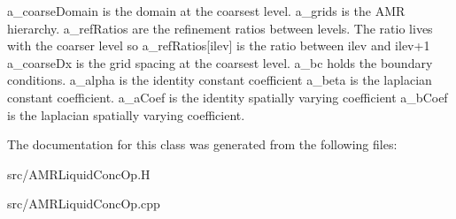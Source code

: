 a\-\_\-coarse\-Domain is the domain at the coarsest level. a\-\_\-grids is the A\-M\-R hierarchy. a\-\_\-ref\-Ratios are the refinement ratios between levels. The ratio lives with the coarser level so a\-\_\-ref\-Ratios\mbox{[}ilev\mbox{]} is the ratio between ilev and ilev+1 a\-\_\-coarse\-Dx is the grid spacing at the coarsest level. a\-\_\-bc holds the boundary conditions. a\-\_\-alpha is the identity constant coefficient a\-\_\-beta is the laplacian constant coefficient. a\-\_\-a\-Coef is the identity spatially varying coefficient a\-\_\-b\-Coef is the laplacian spatially varying coefficient. 

The documentation for this class was generated from the following files\-:\begin{DoxyCompactItemize}
\item 
src/A\-M\-R\-Liquid\-Conc\-Op.\-H\item 
src/A\-M\-R\-Liquid\-Conc\-Op.\-cpp\end{DoxyCompactItemize}
